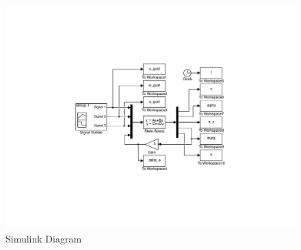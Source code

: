 \documentclass[12pt]{article}
\begin{document}

 
% 


\begin{figure}[h]
\begin{center}
\includegraphics[width=1\textwidth]{figures/simulink}
\caption{Simulink Diagram}
\end{center}
\end{figure}
\end{document}
